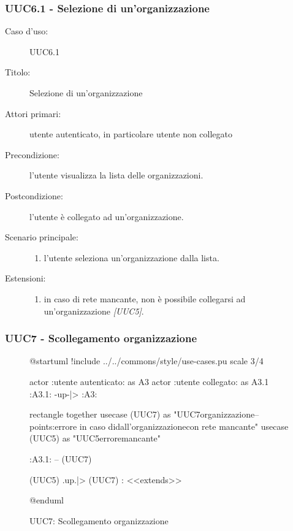 \documentclass[casi-duso]{subfiles}
\begin{document}
\subsubsection{UUC6.1 - Selezione di un'organizzazione}%
\label{subsub:UUC6.1utente}
\begin{description}
  \item[Caso d’uso:] UUC6.1
  \item[Titolo:] Selezione di un'organizzazione
  \item[Attori primari:] utente autenticato, in particolare utente non collegato
  \item[Precondizione:] l'utente visualizza la lista delle organizzazioni.
  \item[Postcondizione:] l'utente è collegato ad un'organizzazione.
  \item[Scenario principale:]
        \begin{enumerate}
          \item l'utente seleziona un'organizzazione dalla lista.
        \end{enumerate}
  \item[Estensioni:]
        \begin{enumerate}
          \item in caso di rete mancante, non è possibile collegarsi ad un'organizzazione \emph{[UUC5]}.
        \end{enumerate}
\end{description}

\subsubsection{UUC7 - Scollegamento organizzazione}%
\label{subsub:UUC7utente}

\begin{figure}[h!]
  \centering
  \begin{plantuml}
  @startuml
  !include ../../commons/style/use-cases.pu
  scale 3/4

  actor :utente autenticato: as A3
  actor :utente collegato: as A3.1
  :A3.1: -up-|> :A3:

  rectangle {
    together {
      usecase (UUC7) as "UUC7\nScollegamento organizzazione\n--\nExtension points:\nVisualizzazione errore in caso di\nscollegamento dall'organizzazione\n con rete mancante"
      usecase (UUC5) as "UUC5\nVisualizzazione errore\nrete mancante"
    }
  }

  :A3.1: -- (UUC7)

  (UUC5) .up.|> (UUC7) : <<extends>>

  @enduml
    \end{plantuml}
  \caption{UUC7: Scollegamento organizzazione}
  \label{fig:uuc7}
\end{figure}
\end{document}
